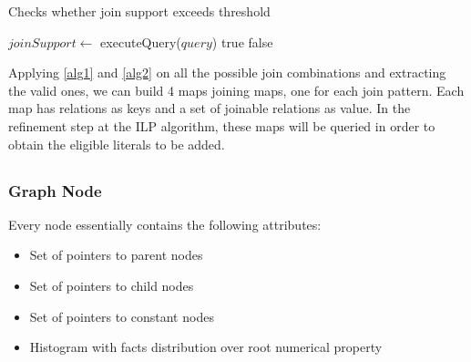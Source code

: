 \begin{algorithm}[!h]
  \caption{Checks whether join support exceeds threshold}
  \label{alg2}
     {
    }
    $joinSupport \leftarrow$ executeQuery($query$)\;
      {
      \Return true\;
    }{
      \Return false\;
    }
\end{algorithm}


Applying \ref{alg1} and \ref{alg2} on all the possible join combinations and extracting the valid ones, we can build 4 maps joining maps, one for each join pattern. Each map has relations as keys and a set of joinable relations as value. In the refinement step at the ILP algorithm, these maps will be queried in order to obtain the eligible literals to be added.

\subsection{\graphname}

\subsubsection{Graph Node}

Every node essentially contains the following attributes:

\begin{itemize}
 \item Set of pointers to parent nodes
 \item Set of pointers to child nodes
 \item Set of pointers to constant nodes
 \item Histogram with facts distribution over root numerical property
\end{itemize}


